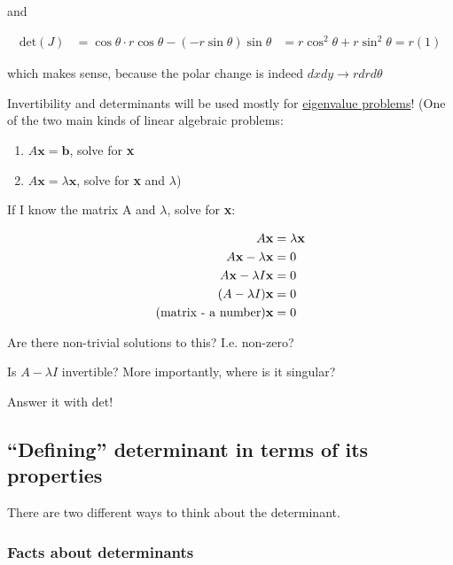 \documentclass[twocolumn,draft]{article}
\begin{document}
\begin{enumerate}
		and
		
		\begin{align*}
			\text{det}(J) &= \cos{\theta}\cdot r\cos{\theta} - (-r\sin{\theta})\sin{\theta}
						  &= r\cos^{2}{\theta} + r\sin^{2}{\theta} = r(1)
		\end{align*}
		
		which makes sense, because the polar change is indeed
		$dxdy \rightarrow rdrd\theta$
  \end{enumerate}
  
  Invertibility and determinants will be used mostly for \underline{eigenvalue problems}!
  (One of the two main kinds of linear algebraic problems:
  \begin{enumerate}
  	\item $A\mathbf{x}=\mathbf{b}$, solve for \textbf{x}
	\item $A\mathbf{x} = \lambda \mathbf{x}$, solve for \textbf{x} and $\lambda$)
  \end{enumerate}
  
  If I know the matrix A and $\lambda$, solve for \textbf{x}:
  
  \begin{align*}
	  A\mathbf{x} &= \lambda \mathbf{x} \\
	  A\mathbf{x} - \lambda \mathbf{x} &= 0 \\
	  A\mathbf{x} - \lambda I \mathbf{x} &= 0 \\
	  (A - \lambda I)\mathbf{x} &= 0 \\
	  (\text{{matrix} - \text{a number}})\mathbf{x} &= 0
  \end{align*}
  
  Are there non-trivial solutions to this? I.e. non-zero?
  
  Is $A-\lambda I$ invertible? More importantly, where is it singular?
  
  Answer it with det!
  
  \subsection*{``Defining'' determinant in terms of its properties}
  
  There are two different ways to think about the determinant.
  
  \subsubsection*{Facts about determinants}
  
\end{document}

